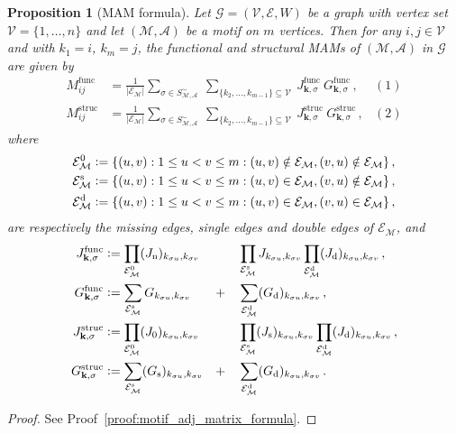 \documentclass[12pt,draft]{ociamthesis}
\theoremstyle{plain}
\newtheorem{proposition}{Proposition}[chapter]
\theoremstyle{definition}
\theoremstyle{remark}
\newcommand\ca[1]{\mathcal{#1}}
\begin{document}
\begin{proposition}[MAM formula] \label{prop:motif_adj_matrix_formula}
  Let $\ca{G} = (\ca{V,E},W)$ be a graph with vertex set
  ${\ca{V}=\{1,\ldots,n\}}$ and let $(\ca{M,A})$ be a motif on $m$ vertices.
  Then for any $i,j \in \ca{V}$ and with $k_1 = i$, $k_m = j$, the functional
  and structural MAMs of $\ca{(M,A)}$ in $\ca{G}$ are given by
  \begin{align*}
    M^\mathrm{func}_{i j} &= \frac{1}{|\ca{E_M}|} \sum_{\sigma \in
    S_\ca{M,A}^\sim} \ \sum_{\{k_2, \ldots, k_{m-1}\} \subseteq \ca{V}} \
    J^\mathrm{func}_{\mathbf{k},\sigma} \
    G^\mathrm{func}_{\mathbf{k},\sigma}\,, &(1) \\
    M^\mathrm{struc}_{i j} &= \frac{1}{|\ca{E_M}|} \sum_{\sigma \in
    S_\ca{M,A}^\sim} \ \sum_{\{k_2, \ldots, k_{m-1}\} \subseteq \ca{V}} \
    J^\mathrm{struc}_{\mathbf{k},\sigma} \
    G^\mathrm{struc}_{\mathbf{k},\sigma}\,, &(2)
  \end{align*}
  where
  \begin{align*}
    \ca{E}_\ca{M}^0 &\vcentcolon= \{ (u,v) : 1 \leq u < v \leq m : (u,v) \notin
    \ca{E_M}, (v,u) \notin \ca{E_M} \}\,, \\
    \ca{E}_\ca{M}^\mathrm{s} &\vcentcolon= \{ (u,v) : 1 \leq u < v \leq m :
    (u,v) \in \ca{E_M}, (v,u) \notin \ca{E_M} \}\,, \\
    \ca{E}_\ca{M}^\mathrm{d} &\vcentcolon= \{ (u,v) : 1 \leq u < v \leq m :
    (u,v) \in \ca{E_M}, (v,u) \in \ca{E_M} \}\,,
  \end{align*}
  are respectively the missing edges, single edges and double edges of
  $\ca{E_M}$, and
  \begin{alignat*}{3}
    J^\mathrm{func}_{\mathbf{k},\sigma}
    & \vcentcolon= \prod_{\ca{E}_\ca{M}^0} (J_\mathrm{n})_{k_{\sigma
    u},k_{\sigma v}}
    && && \prod_{\ca{E}_\ca{M}^\mathrm{s}} J_{k_{\sigma u},k_{\sigma v}}
    \prod_{\ca{E}_\ca{M}^\mathrm{d}} (J_\mathrm{d})_{k_{\sigma u},k_{\sigma
    v}}\,, \\
    G^\mathrm{func}_{\mathbf{k},\sigma}
    & \vcentcolon= \sum_{\ca{E}_\ca{M}^\mathrm{s}} G_{k_{\sigma u},k_{\sigma
    v}}
    && + && \sum_{\ca{E}_\ca{M}^\mathrm{d}} (G_\mathrm{d})_{k_{\sigma
    u},k_{\sigma v}}\,, \\
    J^\mathrm{struc}_{\mathbf{k},\sigma}
    & \vcentcolon= \prod_{\ca{E}_\ca{M}^0} (J_0)_{k_{\sigma u},k_{\sigma v}}
    && && \prod_{\ca{E}_\ca{M}^\mathrm{s}} (J_\mathrm{s})_{k_{\sigma
    u},k_{\sigma v}}
    \prod_{\ca{E}_\ca{M}^\mathrm{d}} (J_\mathrm{d})_{k_{\sigma u},k_{\sigma
    v}}\,, \\
    G^\mathrm{struc}_{\mathbf{k},\sigma}
    &\vcentcolon= \sum_{\ca{E}_\ca{M}^\mathrm{s}} (G_\mathrm{s})_{k_{\sigma
    u},k_{\sigma v}}
    && + && \sum_{\ca{E}_\ca{M}^\mathrm{d}} (G_\mathrm{d})_{k_{\sigma
    u},k_{\sigma v}}\,.
  \end{alignat*}
\end{proposition}
%
\begin{proof}
  See Proof~\ref{proof:motif_adj_matrix_formula}.
\end{proof}
\end{document}
